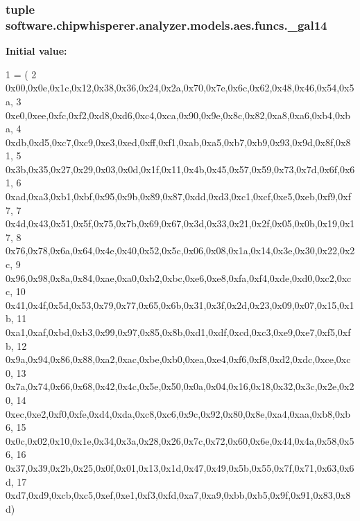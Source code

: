 \subsubsection[{\+\_\+gal14}]{\setlength{\rightskip}{0pt plus 5cm}tuple software.\+chipwhisperer.\+analyzer.\+models.\+aes.\+funcs.\+\_\+gal14}\label{namespacesoftware_1_1chipwhisperer_1_1analyzer_1_1models_1_1aes_1_1funcs_abe5cb75c2c9a3000516e208a0a910756}
{\bfseries Initial value\+:}
\begin{DoxyCode}
1 = (
2 0x00,0x0e,0x1c,0x12,0x38,0x36,0x24,0x2a,0x70,0x7e,0x6c,0x62,0x48,0x46,0x54,0x5a,
3 0xe0,0xee,0xfc,0xf2,0xd8,0xd6,0xc4,0xca,0x90,0x9e,0x8c,0x82,0xa8,0xa6,0xb4,0xba,
4 0xdb,0xd5,0xc7,0xc9,0xe3,0xed,0xff,0xf1,0xab,0xa5,0xb7,0xb9,0x93,0x9d,0x8f,0x81,
5 0x3b,0x35,0x27,0x29,0x03,0x0d,0x1f,0x11,0x4b,0x45,0x57,0x59,0x73,0x7d,0x6f,0x61,
6 0xad,0xa3,0xb1,0xbf,0x95,0x9b,0x89,0x87,0xdd,0xd3,0xc1,0xcf,0xe5,0xeb,0xf9,0xf7,
7 0x4d,0x43,0x51,0x5f,0x75,0x7b,0x69,0x67,0x3d,0x33,0x21,0x2f,0x05,0x0b,0x19,0x17,
8 0x76,0x78,0x6a,0x64,0x4e,0x40,0x52,0x5c,0x06,0x08,0x1a,0x14,0x3e,0x30,0x22,0x2c,
9 0x96,0x98,0x8a,0x84,0xae,0xa0,0xb2,0xbc,0xe6,0xe8,0xfa,0xf4,0xde,0xd0,0xc2,0xcc,
10 0x41,0x4f,0x5d,0x53,0x79,0x77,0x65,0x6b,0x31,0x3f,0x2d,0x23,0x09,0x07,0x15,0x1b,
11 0xa1,0xaf,0xbd,0xb3,0x99,0x97,0x85,0x8b,0xd1,0xdf,0xcd,0xc3,0xe9,0xe7,0xf5,0xfb,
12 0x9a,0x94,0x86,0x88,0xa2,0xac,0xbe,0xb0,0xea,0xe4,0xf6,0xf8,0xd2,0xdc,0xce,0xc0,
13 0x7a,0x74,0x66,0x68,0x42,0x4c,0x5e,0x50,0x0a,0x04,0x16,0x18,0x32,0x3c,0x2e,0x20,
14 0xec,0xe2,0xf0,0xfe,0xd4,0xda,0xc8,0xc6,0x9c,0x92,0x80,0x8e,0xa4,0xaa,0xb8,0xb6,
15 0x0c,0x02,0x10,0x1e,0x34,0x3a,0x28,0x26,0x7c,0x72,0x60,0x6e,0x44,0x4a,0x58,0x56,
16 0x37,0x39,0x2b,0x25,0x0f,0x01,0x13,0x1d,0x47,0x49,0x5b,0x55,0x7f,0x71,0x63,0x6d,
17 0xd7,0xd9,0xcb,0xc5,0xef,0xe1,0xf3,0xfd,0xa7,0xa9,0xbb,0xb5,0x9f,0x91,0x83,0x8d)
\end{DoxyCode}
\hypertarget{namespacesoftware_1_1chipwhisperer_1_1analyzer_1_1models_1_1aes_1_1funcs_a72cff0a386d50150812d3de64c5efa8b}{}
